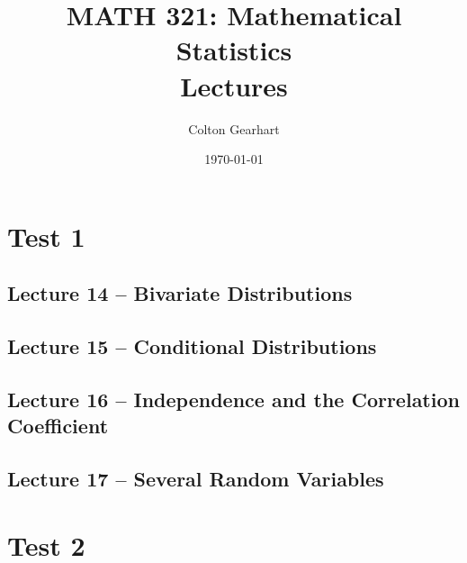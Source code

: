 \documentclass{article}
\title{MATH 321: Mathematical Statistics\\ Lectures}
\author{Colton Gearhart}
\date{\today}
\begin{document}
\setcounter{secnumdepth}{0}		%
\maketitle
\dosecttoc
\tableofcontents
\newpage

\section{Test 1}

\secttoc

\subsection{Lecture 14 -- Bivariate Distributions}
\newpage

\subsection{Lecture 15 -- Conditional Distributions}
\newpage

\subsection{Lecture 16 -- Independence and the Correlation Coefficient}
\newpage

\subsection{Lecture 17 -- Several Random Variables}
\newpage


\section{Test 2}

\secttoc
\end{document}
